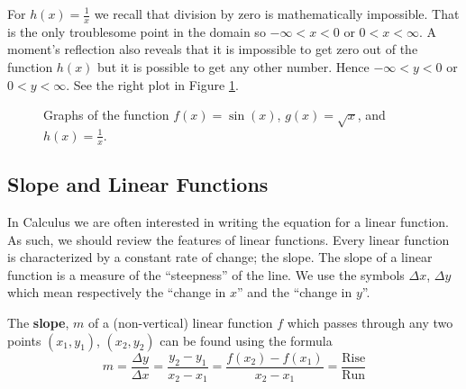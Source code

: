 For $h(x) = \frac{1}{x}$ we recall that division by zero is mathematically impossible.
That is the only troublesome point in the domain so $-\infty < x < 0$ or $0 < x < \infty$.
A moment's reflection also reveals that it is impossible to get zero out of the function
$h(x)$ but it is possible to get any other number.  Hence $-\infty < y < 0$ or $0 < y <
\infty$. See the right plot in Figure \ref{f:0.1ex1}. 
\afterex

\begin{figure}
    \begin{center}
    \end{center}
    \caption{Graphs of the function $f(x) = \sin(x)$, $g(x) = \sqrt{x}$, and $h(x) =
    \frac{1}{x}$.}
    \label{f:0.1ex1}
\end{figure}

\subsection*{Slope and Linear Functions}
In Calculus we are often interested in writing the equation for a linear function.  As
such, we should review the features of linear functions.  Every linear function is
characterized by a constant rate of change; the slope.  The slope of a linear function is
a measure of the ``steepness'' of the line.  We use the symbols $\Delta x$,
$\Delta y$ which
mean respectively the ``change in $x$'' and the ``change in $y$''.  
\begin{definition}
    The {\bf slope}, $m$ of a (non-vertical) linear function $f$ which passes through any
    two points $(x_1,y_1)$, $(x_2,y_2)$ can be found using the formula
    \[ m = \frac{\Delta y}{\Delta x} = \frac{y_2 - y_1}{x_2 - x_1} =
    \frac{f(x_2)-f(x_1)}{x_2-x_1} = \frac{\text{Rise}}{\text{Run}} \]
\end{definition}

